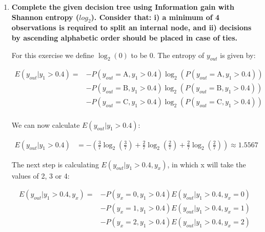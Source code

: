 \documentclass[12pt]{article}
\begin{document}
\begin{enumerate}[leftmargin=\labelsep]
  \item \textbf{Complete the given decision tree using Information gain with Shannon entropy ($log_2$).
          Consider that: i) a minimum of 4 observations is required to split an internal node, and
          ii) decisions by ascending alphabetic order should be placed in case of ties.}

        \vskip 0.3cm
        For this exercise we define $\log_2\left(0\right)$ to be 0. The entropy of \(y_{out}\) is given by:

        \begin{equation}
          \begin{split}
            E(y_{out} |y_1 > 0.4) =
            & - P(y_{out} = \text{A}, y_1 > 0.4) \log_2 \left(P(y_{out} = \text{A}, y_1 > 0.4)\right) \\
            & - P(y_{out} = \text{B}, y_1 > 0.4) \log_2 \left(P(y_{out} = \text{B}, y_1 > 0.4)\right)      \\
            & - P(y_{out} = \text{C}, y_1 > 0.4) \log_2 \left(P(y_{out} = \text{C}, y_1 > 0.4)\right)      \\
          \end{split}
        \end{equation}

        We can now calculate $E(y_{out} |y_1 > 0.4)$:

        \[
          \begin{aligned}
            E(y_{out} |y_1 > 0.4) & = - \left(\frac{3}{7} \log_2\left(\frac{3}{7}\right) + \frac{2}{7} \log_2\left(\frac{2}{7}\right)
            + \frac{2}{7} \log_2\left(\frac{2}{7}\right)\right) \approx 1.5567
          \end{aligned}
        \]

        The next step is calculating $E(y_{out} | y_1 > 0.4 , y_x)$, in which x will take the values of 2, 3 or 4:

        \begin{equation}\label{exI1-e-yout-y2}
          \begin{split}
            E(y_{out} |y_1 > 0.4 , y_x) =
            & - P(y_x = 0, y_1 > 0.4) E(y_{out} | y_1 > 0.4 , y_x = 0) \\
            & - P(y_x = 1, y_1 > 0.4) E(y_{out} | y_1 > 0.4 , y_x = 1) \\
            & - P(y_x = 2, y_1 > 0.4) E(y_{out} | y_1 > 0.4 , y_x = 2)
          \end{split}
        \end{equation}


\end{enumerate}
\end{document}
